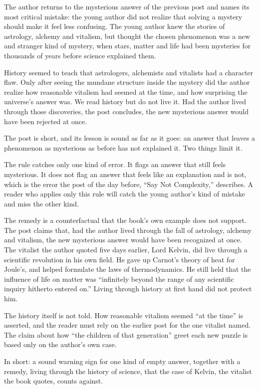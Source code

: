 \begin{afterword}
\summaryhead

The author returns to the mysterious answer of the previous post and names its most critical mistake: the young author did not realize that solving a mystery should make it feel less confusing. The young author knew the stories of astrology, alchemy and vitalism, but thought the chosen phenomenon was a new and stranger kind of mystery, when stars, matter and life had been mysteries for thousands of years before science explained them.

History seemed to teach that astrologers, alchemists and vitalists had a character flaw. Only after seeing the mundane structure inside the mystery did the author realize how reasonable vitalism had seemed at the time, and how surprising the universe's answer was. We read history but do not live it. Had the author lived through those discoveries, the post concludes, the new mysterious answer would have been rejected at once.

\responsehead

The post is short, and its lesson is sound as far as it goes: an answer that leaves a phenomenon as mysterious as before has not explained it. Two things limit it.

The rule catches only one kind of error. It flags an answer that still feels mysterious. It does not flag an answer that feels like an explanation and is not, which is the error the post of the day before, ``Say Not Complexity,'' describes. A reader who applies only this rule will catch the young author's kind of mistake and miss the other kind.

The remedy is a counterfactual that the book's own example does not support. The post claims that, had the author lived through the fall of astrology, alchemy and vitalism, the new mysterious answer would have been recognized at once. The vitalist the author quoted five days earlier, Lord Kelvin, did live through a scientific revolution in his own field. He gave up Carnot's theory of heat for Joule's, and helped formulate the laws of thermodynamics. He still held that the influence of life on matter was ``infinitely beyond the range of any scientific inquiry hitherto entered on.'' Living through history at first hand did not protect him.

The history itself is not told. How reasonable vitalism seemed ``at the time'' is asserted, and the reader must rely on the earlier post for the one vitalist named. The claim about how ``the children of that generation'' greet each new puzzle is based only on the author's own case.

In short: a sound warning sign for one kind of empty answer, together with a remedy, living through the history of science, that the case of Kelvin, the vitalist the book quotes, counts against.
\end{afterword}
